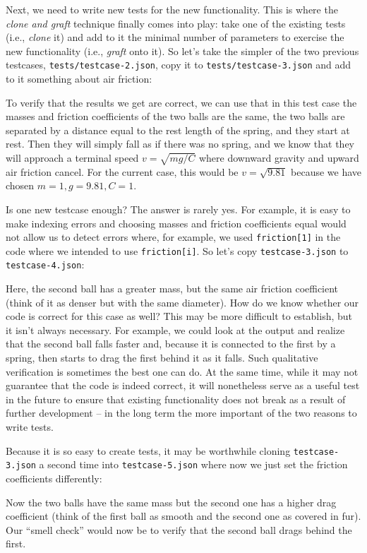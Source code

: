 \documentclass{article}
\begin{document}
Next, we need to write new tests for the new functionality. This is where the
\textit{clone and graft} technique finally comes into play: take one of the
existing tests (i.e., \textit{clone} it) and add to it the minimal number of
parameters to exercise the new functionality (i.e., \textit{graft} onto
it). So let's take the simpler of the two previous testcases,
\texttt{tests/testcase-2.json}, copy it to \texttt{tests/testcase-3.json} and
add to it something about air friction: 

To verify that the results we get are correct, we can use that in this test
case the masses and friction coefficients of the two balls are the same, the
two balls are separated by a distance equal to the rest length of the spring,
and they start at rest. Then they will simply fall as if there was no spring,
and we know that they will approach a terminal speed $v=\sqrt{mg/C}$ where
downward gravity and upward air friction cancel. For the current case, this
would be $v=\sqrt{9.81}$ because we have chosen $m=1, g=9.81, C=1$.

Is one new testcase enough? The answer is rarely yes. For example, it is easy
to make indexing errors and choosing masses and friction coefficients equal
would not allow us to detect errors where, for example, we used
\texttt{friction[1]} in the code where we intended to use \texttt{friction[i]}.
So let's copy \texttt{testcase-3.json} to
\texttt{testcase-4.json}:

Here, the second ball has a greater mass, but the same air friction
coefficient (think of it as denser but with the same diameter). How do we know
whether our code is correct for this case as well? This may be more difficult
to establish, but it isn't always necessary. For example, we could look at the
output and realize that the second ball falls faster and, because it is
connected to the first by a spring, then starts to drag the first behind it as
it falls. Such qualitative verification is sometimes the best one can do. At
the same time, while it may not guarantee that the code is indeed correct, it
will nonetheless serve as a useful test in the future to ensure that existing
functionality does not break as a result of further development -- in the long
term the more important of the two reasons to write tests.

Because it is so easy to create tests, it may be worthwhile cloning
\texttt{testcase-3.json} a second time into
\texttt{testcase-5.json} where now we just set the friction coefficients
differently:

Now the two balls have the same mass but the second one has a higher drag
coefficient (think of the first ball as smooth and the second one as covered
in fur). Our ``smell check'' would now be to verify that the second ball drags
behind the first.
\end{document}
